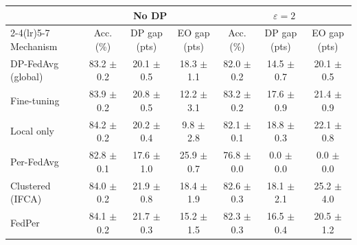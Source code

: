 \begin{tabular}{lcccccc}
\toprule
 & \multicolumn{3}{c}{No DP} & \multicolumn{3}{c}{$\varepsilon=2$} \\
\cmidrule(lr){2-4}\cmidrule(lr){5-7}
Mechanism & Acc. (\%) & DP gap (pts) & EO gap (pts) & Acc. (\%) & DP gap (pts) & EO gap (pts) \\
\midrule
DP-FedAvg (global) & 83.2 $\pm$ 0.2 & 20.1 $\pm$ 0.5 & 18.3 $\pm$ 1.1 & 82.0 $\pm$ 0.2 & 14.5 $\pm$ 0.7 & 20.1 $\pm$ 0.5 \\
Fine-tuning & 83.9 $\pm$ 0.2 & 20.8 $\pm$ 0.5 & 12.2 $\pm$ 3.1 & 83.2 $\pm$ 0.2 & 17.6 $\pm$ 0.9 & 21.4 $\pm$ 0.9 \\
Local only & 84.2 $\pm$ 0.2 & 20.2 $\pm$ 0.4 & 9.8 $\pm$ 2.8 & 82.1 $\pm$ 0.1 & 18.8 $\pm$ 0.3 & 22.1 $\pm$ 0.8 \\
Per-FedAvg & 82.8 $\pm$ 0.1 & 17.6 $\pm$ 1.0 & 25.9 $\pm$ 0.7 & 76.8 $\pm$ 0.0 & 0.0 $\pm$ 0.0 & 0.0 $\pm$ 0.0 \\
Clustered (IFCA) & 84.0 $\pm$ 0.2 & 21.9 $\pm$ 0.8 & 18.4 $\pm$ 1.9 & 82.6 $\pm$ 0.3 & 18.1 $\pm$ 2.1 & 25.2 $\pm$ 4.0 \\
FedPer & 84.1 $\pm$ 0.2 & 21.7 $\pm$ 0.3 & 15.2 $\pm$ 1.5 & 82.3 $\pm$ 0.3 & 16.5 $\pm$ 0.4 & 20.5 $\pm$ 1.2 \\
\bottomrule
\end{tabular}
